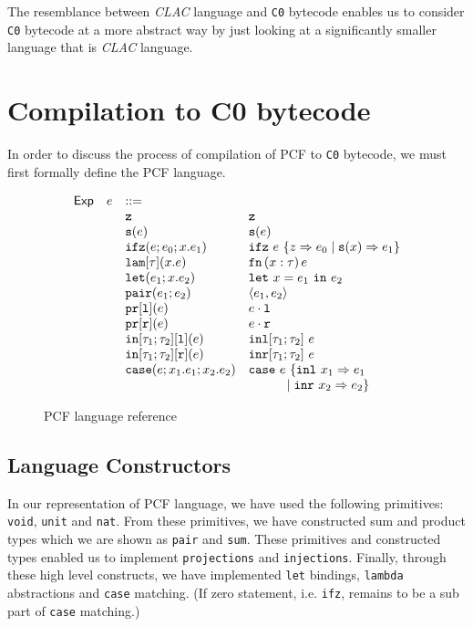 \documentclass{acm_proc_article-sp}
\newcommand{\ccb}{\texttt{C0} bytecode }
\newcommand{\m}[1]{\texttt{#1}}
\newcommand{\ccbi}{\texttt{C0} bytecode}
\newcommand{\clac}{{\em CLAC} language }
\newcommand{\claci}{{\em CLAC} language}
\begin{document}
The resemblance between \clac and \ccb enables us to consider \ccb at a more abstract way by just looking at a significantly smaller language that is \claci.

\section{Compilation to {\secit C0} bytecode}
In order to discuss the process of compilation of PCF to \ccbi, we must first formally define the PCF language. 
\begin{figure}
\[
\begin{array}{c c l l}
\ms{Exp} & e     & ::= \\
	      &     &\zero                     & \zero\\
                &    & \suc(e)                   & \suc(e)\\
                &    & \ifz(e;e_0;x.e_1)         & \ifz ~e~ \{z \goesto e_0 \mid \suc(x) \goesto e_1\}\\
                &    & \lam[\tau](x.e)           & \irl{fn}\,(x : \tau)\,e\\
                &    & \letexp{x}{e_1}{e_2}      & \letbind{x}{e_1}{e_2} \\
                &    & \irl{pair}(e_1;e_2) & \pair{e_1}{e_2}\\
                &    & \irl{pr[l]}(e)        & e \cdot \irl{l}\\
                &    & \irl{pr[r]}(e)        & e \cdot \irl{r}\\
                &    & \inlt(e)        & \irl{inl}[\tau_1; \tau_2] ~e\\
                &    & \inrt(e)        & \irl{inr}[\tau_1; \tau_2] ~e\\
                &    & \ecase(e; x_1.e_1; x_2.e_2)  & \ecase~e~\{\irl{inl}~x_1 \goesto e_1 \\
                &	&	&~~~~~~~~~\mid \irl{inr}~x_2 \goesto e_2\}
\end{array}
\]
\caption{PCF language reference}
\end{figure}
\subsection{Language Constructors}
In our representation of PCF language, we have used the following primitives: \m{void}, \m{unit} and \m{nat}. From these primitives, we have constructed sum and product types which we are shown as \m{pair} and \m{sum}. These primitives and constructed types enabled us to implement \m{projections} and \m{injections}. Finally, through these high level constructs, we have implemented \m{let} bindings, \m{lambda} abstractions and \m{case} matching. (If zero statement, i.e. \m{ifz}, remains to be a sub part of \m{case} matching.)
\end{document}
